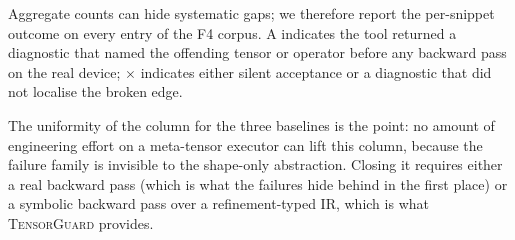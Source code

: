 \documentclass{article}
\begin{document}
Aggregate counts can hide systematic gaps; we therefore report the
per-snippet outcome on every entry of the F4 corpus.
A \checkmark{} indicates the tool returned a diagnostic that
named the offending tensor or operator before any backward pass on
the real device; $\times$ indicates either silent acceptance or a
diagnostic that did not localise the broken edge.

\begin{table}[h]
\centering\small
\setlength{\tabcolsep}{3pt}
\caption{Per-snippet F4 detection outcome. The shape-only abstraction
shared by \texttt{FakeTensorMode}, \texttt{torch.compile} (TorchDynamo),
and Pytea cannot in principle observe a broken autograd edge: none of
the three traces a backward pass, and none of the three reasons about
\texttt{requires\_grad}, \texttt{detach}, or \texttt{no\_grad} regions.
\textsc{TensorGuard}'s \texttt{check\_gradients} pass walks the loss
path symbolically and refutes the autograd reachability of the
target parameter, returning the diagnostics shown in
\S\ref{sec:diagnostics}.}
\label{tab:persnippet}
\end{table}

The uniformity of the column for the three baselines is the point:
no amount of engineering effort on a meta-tensor executor can lift
this column, because the failure family is invisible to the
shape-only abstraction. Closing it requires either a real backward
pass (which is what the failures hide behind in the first place)
or a symbolic backward pass over a refinement-typed IR, which is
what \textsc{TensorGuard} provides.
\end{document}
